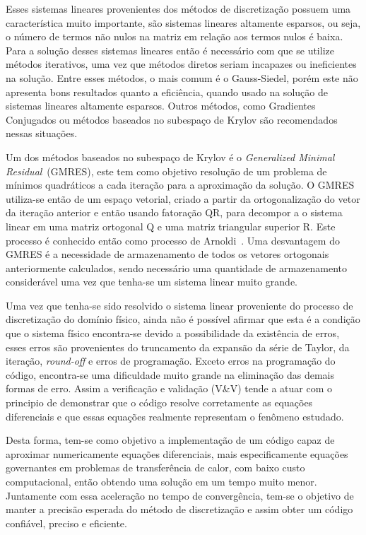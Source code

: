 \documentclass[
	12pt,				  %
	openright,		%
	twoside,			%
	a4paper,			%
	chapter=TITLE,		    %
	english,			%
	brazil				%
	]{abntex2}
\begin{document}
Esses sistemas lineares provenientes dos métodos de discretização possuem uma
característica muito importante, são sistemas lineares altamente esparsos, ou
seja, o número de termos não nulos na matriz em relação aos termos nulos é
baixa. Para a solução desses sistemas lineares então é necessário com que se
utilize métodos iterativos, uma vez que métodos diretos seriam incapazes ou
ineficientes na solução. Entre esses métodos, o mais comum é o Gauss-Siedel,
porém este não apresenta bons resultados quanto a eficiência, quando usado na
solução de sistemas lineares altamente esparsos. Outros métodos, como
Gradientes Conjugados ou métodos baseados no subespaço de Krylov são
recomendados nessas situações.

Um dos métodos baseados no subespaço de Krylov é o \textit{Generalized Minimal
Residual}~(GMRES), este tem como objetivo resolução de um problema de mínimos
quadráticos a cada iteração para a aproximação da solução. O GMRES utiliza-se
então de um espaço vetorial, criado a partir da ortogonalização do vetor da
iteração anterior e então usando fatoração QR, para decompor a o sistema linear
em uma matriz ortogonal Q e uma matriz triangular superior R. Este processo é
conhecido então como processo de Arnoldi~\cite{leveque2007}. Uma desvantagem do
GMRES é a necessidade de armazenamento de todos os vetores ortogonais
anteriormente calculados, sendo necessário uma quantidade de armazenamento
considerável uma vez que tenha-se um sistema linear muito grande.

Uma vez que tenha-se sido resolvido o sistema linear proveniente do processo de
discretização do domínio físico, ainda não é possível afirmar que esta é a
condição que o sistema físico encontra-se devido a possibilidade da existência de
erros, esses erros são provenientes do truncamento da expansão da série de
Taylor, da iteração, \textit{round-off} e erros de programação. Exceto erros na
programação do código, encontra-se uma dificuldade muito grande na eliminação
das demais formas de erro. Assim a verificação e validação (V\&V) tende a atuar
com o principio de demonstrar que o código resolve corretamente as equações
diferenciais e que essas equações realmente representam o fenômeno estudado.

Desta forma, tem-se como objetivo a implementação de um código capaz de
aproximar numericamente equações diferenciais, mais especificamente equações
governantes em problemas de transferência de calor, com baixo custo
computacional, então obtendo uma solução em um tempo muito menor. Juntamente
com essa aceleração no tempo de convergência, tem-se o objetivo de manter a
precisão esperada do método de discretização e assim obter um código confiável,
preciso e eficiente.
\end{document}
